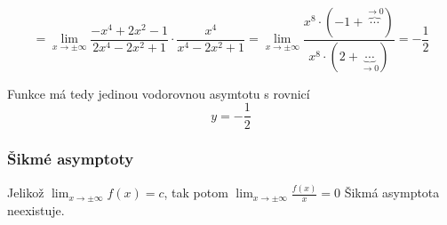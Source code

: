 \begin{displaymath}
= \lim_{x \to \pm \infty} \frac{-x^4+2x^2-1}{2x^4-2x^2+1} \cdot \frac{x^4}{x^4-2x^2+1} = \lim_{x \to \pm \infty} \frac {x^8\cdot(-1+ \overbrace{\cdots}^{\rightarrow0})}{x^8\cdot (2 +\underbrace{\cdots}_{\rightarrow0})} = -\frac{1}{2}
\end{displaymath}

Funkce má tedy jedinou vodorovnou asymtotu s rovnicí
\begin{displaymath}
y = - \frac{1}{2}
\end{displaymath}

\subsubsection{Šikmé asymptoty}

Jelikož $\lim_{x \to \pm \infty} f(x) = c$, tak potom $\lim_{x \to \pm \infty} \frac{f(x)}{x} = 0$ Šikmá asymptota neexistuje. 
